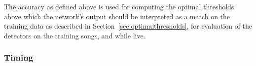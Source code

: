\documentclass[10pt,letterpaper]{article}
\newcommand\sref[1]{Section~\ref{#1}}
\let\oldmarginpar\marginpar
\renewcommand{\marginpar}[1]{\oldmarginpar{\linespread{1}\scriptsize{#1}}}
\newcommand\argmin{\mathop{\textrm{{\rm argmin}}}\limits}
\newcommand{\noprint}[1]{}
\begin{document}


The accuracy as defined above is used for computing the optimal
thresholds above which the network's output should be interpreted as a
match on the training data as described in
\sref{sec:optimalthresholds}, for evaluation of the detectors on the
training songs, and while live.

\noprint{ Since the network will output values $o_t$ between 0 and 1
  at each moment $t$ in an attempt to match the training output, the
  optimal threshold $\tau\in[0,1]$ for the output neuron should be
  computed.  Given the relative cost of false positives vs.~false
  negatives $C$, and the acceptable time difference between target
  syllable and correct output $\Delta t_d$, we compute the optimal
  threshold for an output element according to the definitions above:
\begin{eqnarray*}
  \textrm{true positives}_\tau &=& \textrm{size of set}_{s\in \textrm{target songs}} o_t > \tau, \left| t \leq \Delta t_d \right| \\
  \textrm{false negatives}_\tau &=& \textrm{size of set} {s\in\textrm{target songs}} - \textrm{size of set} \textrm{true positives} \\
  \textrm{false positives}_\tau &=& \textrm{size of set}_{s\in \textrm{target songs}} o_t > \tau, \left| t > \Delta t_d \right| \\
  \widehat{\tau} &=& \argmin_\tau C\textrm{false positive} + \textrm{false negatives}
\end{eqnarray*}
}

\subsubsection{Timing}
\end{document}
